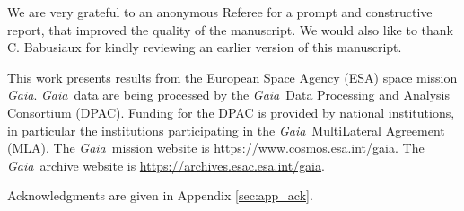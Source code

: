 \documentclass{aa}
\newcommand{\gaia}{\textit{Gaia}\xspace}
\begin{document}

\begin{acknowledgements}
We are very grateful to an anonymous Referee for a prompt and constructive report, that improved the quality of the manuscript. We would also like to thank C. Babusiaux for kindly reviewing an earlier version of this manuscript.

This work presents results from the European Space Agency (ESA) space mission \gaia. \gaia\ data are being processed by the \gaia\ Data Processing and Analysis Consortium (DPAC). Funding for the DPAC is provided by national institutions, in particular the institutions participating in the \gaia\ MultiLateral Agreement (MLA). The \gaia\ mission website is \url{https://www.cosmos.esa.int/gaia}. The \gaia\ archive website is \url{https://archives.esac.esa.int/gaia}. 

Acknowledgments are given in Appendix \ref{sec:app_ack}.
\end{acknowledgements}




\end{document}
